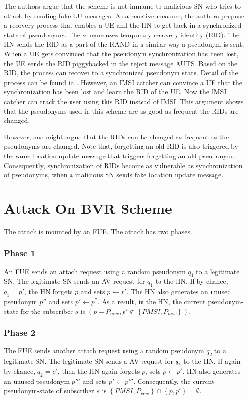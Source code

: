 \documentclass{llncs} %
\begin{document}
The authors argue that the scheme is not immune to malicious SN who tries to attack by sending fake LU messages. As a reactive measure, the authors propose a recovery process that enables a UE and the HN to get back in a synchronized state of pseudonyms. The scheme uses temporary recovery identity (RID). The HN sends the RID as a part of the RAND in a similar way a pseudonym is sent. When a UE gets convinced that the pseudonym synchronization has been lost, the UE sends the RID piggybacked in the reject message AUTS. Based on the RID, the process can recover to a synchronized pseudonym state. Detail of the process can be found in \cite{wisec17}. However, an IMSI catcher can convince a UE that the synchronization has been lost and learn the RID of the UE. Now the IMSI catcher can track the user using this RID instead of IMSI. This argument shows that the pseudonyms used in this scheme are as good as frequent the RIDs are changed. 

However, one might argue that the RIDs can be changed as frequent as the pseudonyms are changed. Note that, forgetting an old RID is also triggered by the same location update message that triggers forgetting an old pseudonym. Consequently, synchronization of RIDs become as vulnerable as synchronization of pseudonyms, when a malicious SN sends fake location update message.

\section{Attack On BVR Scheme} \label{sec:attack}
The attack is mounted by an FUE. The attack has two phases.

\subsubsection{Phase 1} \label{sec:attac_fue_phase1}  An FUE sends an attach request using a random pseudonym $q_1$ to a legitimate SN. The legitimate SN sends an AV request for $q_1$ to the HN. If by chance, $q_1 = p'$, the HN forgets $p$ and sets $p \leftarrow p'$. The HN also generates an unused pseudonym $p''$ and sets $p' \leftarrow p^{''}$. As a result, in the HN, the current  pseudonym-state for the subscriber $s$ is $\left(p = P_{new},p' \notin \left\lbrace PMSI,P_{new} \right\rbrace \right)$. %

\subsubsection{Phase 2} \label{sec:attac_fue_phase2} The FUE sends another attach request using a random pseudonym $q_2$ to a legitimate SN. The legitimate SN sends a AV request for $q_2$ to the HN. If again by chance, $q_2 = p'$, then the HN again forgets $p$, sets $p \leftarrow p'$. HN also generates an unused pseudonym $p'''$ and sets $p' \leftarrow p'''$. Consequently, the current pseudonym-state of subscriber $s$ is $\left\lbrace PMSI,P_{new} \right\rbrace \cap \left\lbrace p,p' \right\rbrace = \emptyset$. %
\end{document}
